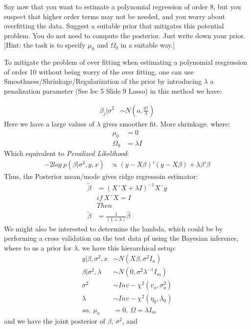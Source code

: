 \documentclass[
]{article}
\begin{document}
Say now that you want to estimate a polynomial regression of order 8,
but you suspect that higher order terms may not be needed, and you worry
about overfitting the data. Suggest a suitable prior that mitigates this
potential problem. You do not need to compute the posterior. Just write
down your prior. {[}Hint: the task is to specify \(\mu_0\) and
\(\Omega_0\) in a suitable way.{]}

To mitigate the problem of over fitting when estimating a polynomial
resgression of order 10 without being worry of the over fitting, one can
use Smoothness/Shrinkage/Regularization of the prior by introducing
\(\lambda\) a penalization parameter (See lec 5 Slide 9 Lasso) in this
method we have:

\[
\begin{aligned}
\beta_j|\sigma^2&\sim N(o,\frac{\sigma^2}{\lambda})
\end{aligned}
\] Here we have a large values of \(\lambda\) gives smoother fit. More
shrinkage. where: \[
\begin{aligned}
\mu_0&=0\\
\Omega_0&= \lambda I
\end{aligned}
\] Which equivalent to \emph{Penalized Likelihood}: \[
\begin{aligned}
-2log\ p(\beta|\sigma^2,y,x) &\propto(y-X\beta)'(y-X\beta)+\lambda\beta'\beta
\end{aligned}
\] Thus, the Posterior mean/mode gives ridge regressoin estimator: \[
\begin{aligned}
\tilde \beta &= (X´X+\lambda I)^{-1}X´y\\
&if \ X´X= I\\
&Then\\
\tilde \beta &= \frac{1}{(1+\lambda)}\hat\beta
\end{aligned}
\] We might also be interested to determine the lambda, which could be
by performing a cross validation on the test data pf using the Bayesian
inference, where to us a prior for \(\lambda\). we have this
hierarchical setup: \[
\begin{aligned}
y|\beta,\sigma^2,x &\sim N(X\beta,\sigma^2I_n)\\
\beta|\sigma^2,\lambda&\sim N(0,\sigma^2\lambda^{-1}I_m)\\
\sigma^2&\sim Inv-\chi^2(v_o,\sigma_o^2)\\
\lambda&\sim Inv-\chi^2(\eta_0,\lambda_0)\\
so,\ \mu_o&=0,\  \Omega=\lambda I_m
\end{aligned}
\] and we have the joint posterior of \(\beta\), \(\sigma^2\), and
\end{document}

